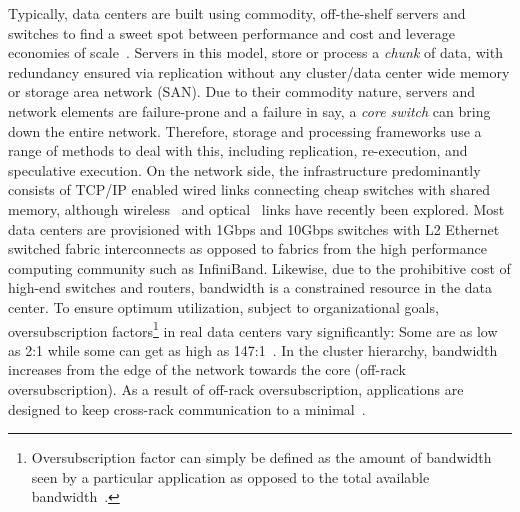\documentclass[a4paper,12pt,twoside,openright]{report}
\begin{document}
Typically, data centers are built using commodity, off-the-shelf servers and
switches to find a sweet spot between performance and cost and leverage
economies of scale~\cite{Barroso:2003:WSP}. Servers in this model, store or
process a \emph{chunk} of data, with redundancy ensured via replication without
any cluster/data center wide memory or storage area network (SAN). Due to their
commodity nature, servers and network elements are failure-prone and a failure
in say, a \emph{core switch} can bring down the entire network. Therefore,
storage and processing frameworks use a range of methods to deal with this,
including replication, re-execution, and speculative execution. On the network
side, the infrastructure predominantly consists of TCP/IP enabled wired links
connecting cheap switches with shared memory, although
wireless~\cite{Halperin:2011:ADC} and
optical~\cite{Wang:2010:CPO,Farrington:2010:HHE} links have recently been
explored. Most data centers are provisioned with 1Gbps and 10Gbps switches with
L2 Ethernet switched fabric interconnects as opposed to fabrics from the high
performance computing community such as InfiniBand. Likewise, due to the
prohibitive cost of high-end switches and routers, bandwidth is a constrained
resource in the data center. To ensure optimum utilization, subject to
organizational goals, oversubscription factors\footnote{Oversubscription factor
can simply be defined as the amount of bandwidth seen by a particular
application as opposed to the total available
bandwidth~\cite{Al-Fares:2008:SCD}.} in real data centers vary significantly:
Some are as low as 2:1 while some can get as high as
147:1~\cite{Benson:2010:NTC}. In the cluster hierarchy, bandwidth increases from
the edge of the network towards the core (off-rack oversubscription). As a
result of off-rack oversubscription, applications are designed to keep
cross-rack communication to a minimal~\cite{Dean:2004:MSD}.
\end{document}
